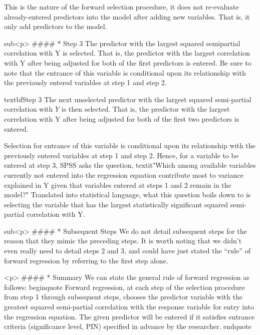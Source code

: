 This is the nature of the forward selection procedure, it does not re-evaluate already-entered predictors into the model after adding new variables. That is, it only add predictors to the model. 


sub<p>
####        * {Step 3}
The predictor with the largest squared semipartial correlation with Y is selected. That is, the predictor with the largest correlation with Y after being adjusted for both of the first predictors is entered. Be sure to note that the entrance of this variable is conditional upon its relationship with the previously entered variables at step 1 and step 2. 

textbf{Step 3}
The next unselected predictor with the largest squared semi-partial correlation with $Y$ is then selected. That is, the predictor with the largest correlation with Y after being adjusted for both of the first two predictors is entered. 

Selection for entrance of this variable is conditional upon its relationship with the previously entered variables at step 1 and step 2. Hence, for a variable to be entered at step 3, SPSS asks the question, textit{"Which among available variables currently not entered into the regression equation contribute most to variance explained in Y given that variables entered at steps 1 and 2 remain in the model?"} Translated into statistical language, what this question boils down to is selecting the variable that has the largest statistically significant squared semi-partial correlation with Y.




sub<p>
####        * {Subsequent Steps} 
We do not detail subsequent steps for the reason that they mimic the preceding steps. It is worth noting that we didn’t even really need to detail steps 2 and 3, and could have just stated the “rule” of forward regression by referring to the first step alone. 

<p>
####        * {Summary}
We can state the general rule of forward regression as follows:
begin{quote}
	Forward regression, at each step of the selection procedure from step 1 through subsequent steps, chooses the predictor variable with the greatest squared semi-partial correlation with the response variable for entry into the regression equation. The given predictor will be entered if it satisfies entrance criteria (significance level, PIN) specified in advance by the researcher.
end{quote}


